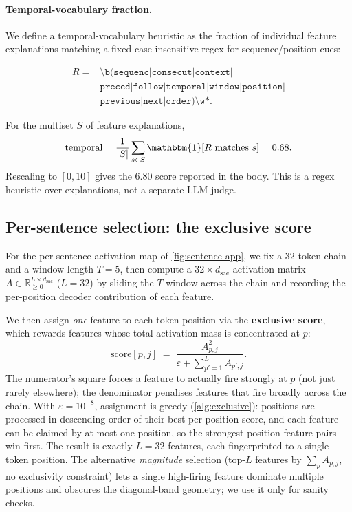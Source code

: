\paragraph{Temporal-vocabulary fraction.}
We define a temporal-vocabulary heuristic as the fraction of individual feature
explanations matching a fixed case-insensitive regex for sequence/position cues:
\begin{small}
\[
\begin{aligned}
R ={}& \texttt{\textbackslash b(sequenc|consecut|context|}\\
     & \texttt{preced|follow|temporal|window|position|}\\
     & \texttt{previous|next|order)\textbackslash w*}.
\end{aligned}
\]
\end{small}
For the multiset $S$ of feature explanations,
\[
    \mathrm{temporal}
    =
    \frac{1}{|S|}\sum_{s\in S}\mathbbm{1}[R \text{ matches } s]
    =
    0.68.
\]
Rescaling to $[0,10]$ gives the $6.80$ score reported in the body. This is a regex heuristic over explanations, not a separate LLM judge.

\subsection{Per-sentence selection: the exclusive score}
\label{app:meta-exclusive}
For the per-sentence activation map of \cref{fig:sentence-app}, we fix a $32$-token chain and a window length $T{=}5$, then compute a $32 \times d_{\text{sae}}$ activation matrix $A\in\mathbb{R}_{\geq 0}^{L\times d_{\text{sae}}}$ ($L{=}32$) by sliding the $T$-window across the chain and recording the per-position decoder contribution of each feature.

We then assign \emph{one} feature to each token position via the \textbf{exclusive score}, which rewards features whose total activation mass is concentrated at $p$:
\begin{equation}
    \mathrm{score}[p, j] \;=\; \frac{A_{p, j}^2}{\varepsilon + \sum_{p'=1}^{L} A_{p', j}}.
    \label{eq:exclusive-score}
\end{equation}
The numerator's square forces a feature to actually fire strongly at $p$ (not just rarely elsewhere); the denominator penalises features that fire broadly across the chain. With $\varepsilon=10^{-8}$, assignment is greedy (\cref{alg:exclusive}): positions are processed in descending order of their best per-position score, and each feature can be claimed by at most one position, so the strongest position-feature pairs win first. The result is exactly $L{=}32$ features, each fingerprinted to a single token position. The alternative \emph{magnitude} selection (top-$L$ features by $\sum_p A_{p,j}$, no exclusivity constraint) lets a single high-firing feature dominate multiple positions and obscures the diagonal-band geometry; we use it only for sanity checks.

